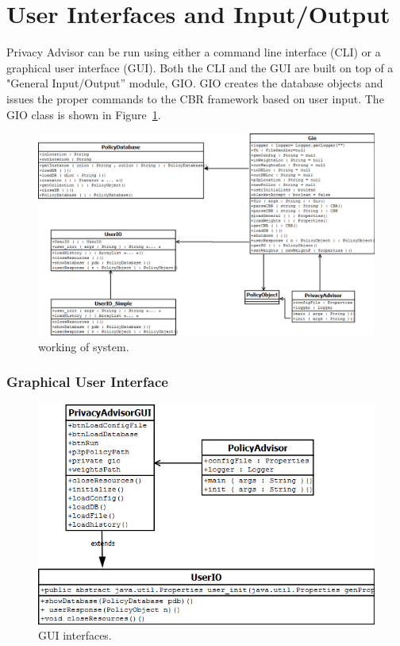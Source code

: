 \section{User Interfaces and Input/Output}
Privacy Advisor can be run using either a command line interface (CLI) or a graphical user interface (GUI). Both the CLI and the GUI are built on top of a "General Input/Output'' module, GIO. GIO creates the database objects and issues the proper commands to the CBR framework based on user input. The GIO class is shown in Figure~\ref{gioFig}. 

\begin{figure}[htbp]
\begin{center}
\includegraphics[width = \textwidth]{DesignReport/uml/gio.png}
\caption{working of system.}
\label{gioFig}
\end{center}
\end{figure}


\subsubsection{Graphical User Interface} 

\begin{figure}[htbp]
\begin{center}
\includegraphics[width = \textwidth]{DesignReport/uml/policyadvisorgui}
\caption{GUI interfaces.}
\label{GUI_interface}
\end{center}
\end{figure}

